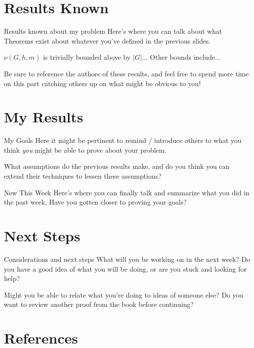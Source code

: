 \documentclass[aspectratio=169,usenames,dvipsnames]{beamer}
\begin{document}
\section{Results Known}

\begin{frame}[fragile]{Results known about my problem}
Here's where you can talk about what Theorems exist about whatever you've defined in the previous slides.

\s $\nu(G, h, m)$ is trivially bounded above by $|G|$... Other bounds include...

\s Be sure to reference the authors of these results, and feel free to spend more time on this part catching others up on what might be obvious to you!
\end{frame}

\section{My Results}

\begin{frame}[fragile]{My Goals}
Here it might be pertinent to remind / introduce others to what you think \textit{you} might be able to prove about your problem.

\s What assumptions do the previous results make, and do you think you can extend their techniques to lessen these assumptions?
\end{frame}

\begin{frame}[fragile]{New This Week}
Here's where you can finally talk and summarize what you did in the past week. Have you gotten closer to proving your goals?
\end{frame}

\section{Next Steps}

\begin{frame}[fragile]{Considerations and next steps}
What will you be working on in the next week? Do you have a good idea of what you will be doing, or are you stuck and looking for help?

\s Might you be able to relate what you're doing to ideas of someone else? Do you want to review another proof from the book before continuing?
\end{frame}

\section{References}
\end{document}
